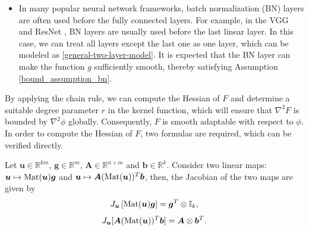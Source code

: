 \documentclass[twoside,11pt]{article}
\newcommand{\R}{\mathbb R}
\def\Mat{{\rm Mat}}
\def\vb{{\bm{b}}}
\def\vg{{\bm{g}}}
\def\vu{{\bm{u}}}
\def\mA{{\bm{A}}}
\begin{document}
\begin{remark}
\begin{itemize}
\item[2.] In many popular neural network frameworks, batch normalization (BN) layers \citep{ioffe2015batch} are often used before the fully connected layers. For example, in the VGG \citep{simonyan2014very} and ResNet \citep{he2016deep}, BN layers are usually used before the last linear layer. In this case, we can treat all layers except the last one as one layer, which can be modeled as \eqref{general-two-layer-model}. It is expected that the BN layer can make the function $g$ sufficiently smooth, thereby satisfying  Assumption \ref{bound_assumption_bn}.
\end{itemize}
\end{remark}

By applying the chain rule, we can compute the Hessian of $F$ and determine a suitable degree parameter $r$ in the kernel function, which will ensure that $\nabla^2F$ is bounded by $\nabla^2\phi$ globally. Consequently, $F$ is smooth adaptable with respect to $\phi$.
In order to compute the Hessian of $F$, two formulas are required, which can be verified directly.\vspace{-0.1cm}
\begin{lemma}
Let $\vu\in\R^{km}$, $\vg\in\R^m$, $\mA \in\R^{n\times m}$ and $\vb\in\R^k$. Consider two linear maps: $\vu\mapsto\Mat(\vu)\vg$ and $\vu\mapsto \mA(\Mat(\vu))^T\vb$, then, the Jacobian of the two maps are given by
\[
J_{\vu}\left[\Mat(\vu)\vg\right]=\vg^T\otimes\mathbb{I}_k,
\]
\[
J_{\vu}[\mA(\Mat(\vu))^T\vb]=\mA \otimes \vb^T.
\]
\label{Jac-Hess-aux-lemma}
\end{lemma}\vspace{-0.5cm}
\end{document}
